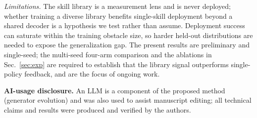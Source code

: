 \documentclass[conference]{IEEEtran}
\begin{document}
\emph{Limitations.} The skill library is a measurement lens and is never deployed;
whether training a diverse library benefits single-skill deployment beyond a
shared decoder is a hypothesis we test rather than assume. Deployment success can
saturate within the training obstacle size, so harder held-out distributions are
needed to expose the generalization gap. The present results are preliminary and
single-seed; the multi-seed four-arm comparison and the ablations in
Sec.~\ref{sec:exp} are required to establish that the library signal outperforms
single-policy feedback, and are the focus of ongoing work.

\textbf{AI-usage disclosure.} An LLM is a component of the proposed method
(generator evolution) and was also used to assist manuscript editing; all
technical claims and results were produced and verified by the authors.



\end{document}
